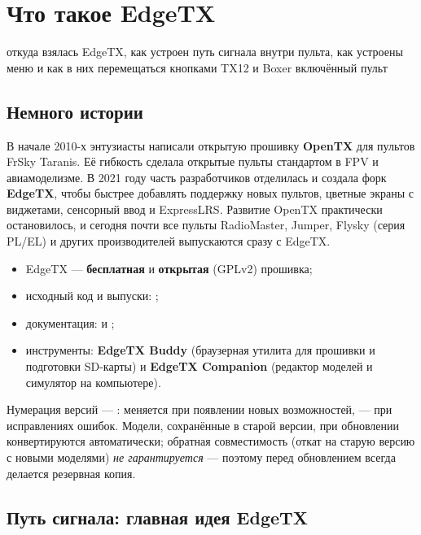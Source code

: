 \chapter{Что такое EdgeTX}
\chapterintro
  {откуда взялась EdgeTX, как устроен путь сигнала внутри пульта, как устроены меню и как
   в них перемещаться кнопками TX12 и Boxer}
  {включённый пульт}

\section{Немного истории}

В начале 2010-х энтузиасты написали открытую прошивку \textbf{OpenTX} для пультов FrSky Taranis.
Её гибкость сделала открытые пульты стандартом в FPV и авиамоделизме. В 2021 году часть
разработчиков отделилась и создала форк \textbf{EdgeTX}, чтобы быстрее добавлять поддержку
новых пультов, цветные экраны с виджетами, сенсорный ввод и ExpressLRS. Развитие OpenTX
практически остановилось, и сегодня почти все пульты RadioMaster, Jumper, Flysky (серия PL/EL)
и других производителей выпускаются сразу с EdgeTX.

\begin{itemize}
  \item EdgeTX --- \textbf{бесплатная} и \textbf{открытая} (GPLv2) прошивка;
  \item исходный код и выпуски: ;
  \item документация:  и ;
  \item инструменты: \textbf{EdgeTX Buddy} (браузерная утилита для прошивки и подготовки SD-карты)
        и \textbf{EdgeTX Companion} (редактор моделей и симулятор на компьютере).
\end{itemize}

Нумерация версий --- :  меняется при появлении новых возможностей,
 --- при исправлениях ошибок. Модели, сохранённые в старой версии, при обновлении
конвертируются автоматически; обратная совместимость (откат на старую версию с новыми
моделями) \emph{не гарантируется} --- поэтому перед обновлением всегда делается резервная копия.

\section{Путь сигнала: главная идея EdgeTX}

